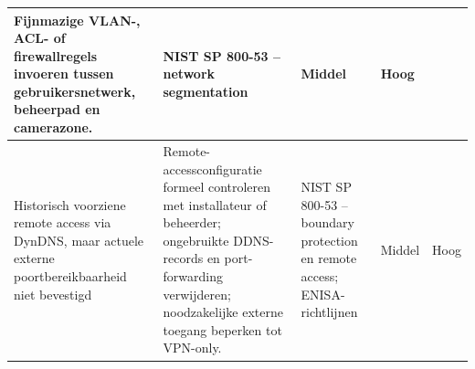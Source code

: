 \begin{table}[H]
\begin{tabularx}{\textwidth}{p{}X p{}p{}p{}}
        Fijnmazige VLAN-, ACL- of firewallregels invoeren tussen gebruikersnetwerk, beheerpad en camerazone. &
        NIST SP 800-53 -- network segmentation &
        Middel & Hoog \\
        \hline
        Historisch voorziene remote access via DynDNS, maar actuele externe poortbereikbaarheid niet bevestigd &
        Remote-accessconfiguratie formeel controleren met installateur of beheerder; ongebruikte DDNS-records en port-forwarding verwijderen; noodzakelijke externe toegang beperken tot VPN-only. &
        NIST SP 800-53 -- boundary protection en remote access; ENISA-richtlijnen &
        Middel & Hoog \\
        \hline
    \end{tabularx}
\end{table}

\subsection{}%
\label{app:mitigaties-middel}

